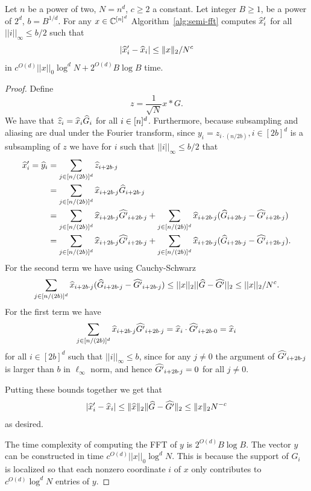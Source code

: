 \begin{lemma}\label{l:semiequi1}
  Let $n$ be a power of two, $N=n^d$, $c\geq 2$ a constant. Let integer $B\geq 1$, be a power of $2^d$, $b=B^{1/d}$. For any $x\in \C^\nsq$ Algorithm~\ref{alg:semi-fft} computes $\wh{x}'_i$
  for all $||i||_\infty \leq b/2$ such that
  \[
  \abs{\wh{x}'_i - \wh{x}_i} \leq \norm{2}{x} / N^c
  \]
in $c^{O(d)}||x||_0 \log^{d} N+2^{O(d)}B\log B$   time.
\end{lemma}
\begin{proof}
  Define
  \[
  z = \frac{1}{\sqrt{N}}x * G.
  \]
  We have that $\wh{z}_i = \wh{x}_i \wh{G}_i$ for all $i\in \nsq$.
  Furthermore, because subsampling and aliasing are dual under the
  Fourier transform, since $y_i = z_{i\cdot (n/2b)}, i\in [2b]^d$ is a subsampling of $z$ we have for
  $i$ such that $||i||_\infty \leq b/2$ that
  \begin{align*}
    \wh{x}'_i = \wh{y}_i &= \sum_{j \in [n/(2b)]^d} \wh{z}_{i + 2b\cdot j} \\
    &= \sum_{j\in [n/(2b)]^d} \wh{x}_{i + 2b \cdot j}\wh{G}_{i+2b\cdot j} \\
    &= \sum_{j\in [n/(2b)]^d } \wh{x}_{i + 2b\cdot j}\wh{G'}_{i+2b\cdot j} + \sum_{j\in [n/(2b)]^d} \wh{x}_{i + 2b\cdot j}(\wh{G}_{i+2b\cdot j} - \wh{G'}_{i+2b\cdot j})\\
    &= \sum_{j\in [n/(2b)]^d} \wh{x}_{i +
      2b\cdot j}\wh{G'}_{i+2b\cdot j}+ \sum_{j\in [n/(2b)]^d} \wh{x}_{i +
      2b\cdot j}(\wh{G}_{i+2b\cdot j} -\wh{G'}_{i+2b\cdot j}).
  \end{align*}
For the second term we have using Cauchy-Schwarz 
$$
\sum_{j\in [n/(2b)]^d} \wh{x}_{i + 2b\cdot j}(\wh{G}_{i+2b\cdot j} -\wh{G'}_{i+2b\cdot j})\leq ||x||_2 ||\wh{G} -\wh{G'}||_2\leq ||x||_2/N^c.
$$
For the first term we have 
$$
\sum_{j\in [n/(2b)]^d} \wh{x}_{i + 2b\cdot j}\wh{G'}_{i+2b\cdot j}=\wh{x}_i\cdot \wh{G'}_{i+2b\cdot 0}=\wh{x}_i
$$
for all $i\in [2b]^d$ such that $||i||_\infty\leq b$, since for any $j\neq 0$ the argument of $\wh{G'}_{i+2b\cdot j}$ is larger than $b$ in $\ell_\infty$ norm, and hence $\wh{G'}_{i+2b\cdot j}=0$ for all $j\neq 0$. 

Putting these bounds together we get that 
  \[
  \abs{\wh{x}'_i - \wh{x}_i} \leq \norm{2}{\wh{x}}
  \norm{2}{\wh{G}-\wh{G'}} \leq \norm{2}{x}N^{-c}
  \]
  as desired.

  The time complexity of computing the FFT of $y$ is $2^{O(d)}B\log B$. 
  The vector $y$ can  be constructed in time $c^{O(d)}||x||_0\log^d N$. This is because the support of $G_i$ is localized so that 
  each nonzero coordinate $i$ of $x$ only contributes to $c^{O(d)}\log^d N$
  entries of $y$. 
\end{proof}

